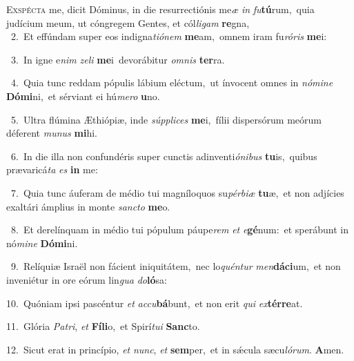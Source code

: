 \lettrine{\initial\textcolor{\initialcolor}{E}}{xspécta} me, dicit Dóminus, in die resurrectiónis me\textit{æ} \textit{in} \textit{fu}\-\textbf{tú}rum,~\star quia judícium meum, ut cóngregem Gentes, et cól\-\textit{li}\-\textit{gam} \textbf{re}\-gna,\\
{\numbfont\textcolor{\numbcolor}{~2.}}~Et effúndam super eos indigna\-\textit{ti}\-\textit{ó}\textit{nem} \textbf{me}\-am,~\star omnem iram fu\-\textit{ró}\-\textit{ris} \textbf{me}\-i:\par
{\numbfont\textcolor{\numbcolor}{~3.}}~In igne e\textit{nim} \textit{ze}\-\textit{li} \textbf{me}\-i~\star devorábitur \textit{om}\-\textit{nis} \textbf{ter}\-ra.\par
{\numbfont\textcolor{\numbcolor}{~4.}}~Quia tunc reddam pópulis lábium eléctum,~\dagger ut ínvocent omnes in \textit{nó}\-\textit{mi}\textit{ne} \textbf{Dó}\-\textbf{mi}ni,~\star et sérviant ei hú\-\textit{me}\-\textit{ro} \textbf{u}\-no.\par
{\numbfont\textcolor{\numbcolor}{~5.}}~Ultra flúmina Æthiópiæ, inde \textit{súp}\-\textit{pli}\textit{ces} \textbf{me}\-i,~\star fílii dispersórum meórum déferent \textit{mu}\-\textit{nus} \textbf{mi}\-hi.\par
{\numbfont\textcolor{\numbcolor}{~6.}}~In die illa non confundéris super cunctis adinventi\-\textit{ó}\-\textit{ni}\textit{bus} \textbf{tu}\-is,~\star quibus prævaricá\textit{ta} \textit{es} \textbf{in} me:\par
{\numbfont\textcolor{\numbcolor}{~7.}}~Quia tunc áuferam de médio tui magníloquos su\-\textit{pér}\-\textit{bi}\textit{æ} \textbf{tu}\-æ,~\star et non adjícies exaltári ámplius in monte \textit{sanc}\-\textit{to} \textbf{me}\-o.\par
{\numbfont\textcolor{\numbcolor}{~8.}}~Et derelínquam in médio tui pópulum páupe\textit{rem} \textit{et} \textit{e}\-\textbf{gé}num:~\star et sperábunt in nó\-\textit{mi}\-\textit{ne} \textbf{Dó}\-\textbf{mi}ni.\par
{\numbfont\textcolor{\numbcolor}{~9.}}~Relíquiæ Israël non fácient iniquitátem,~\dagger nec lo\-\textit{quén}\-\textit{tur} \textit{men}\-\textbf{dá}\textbf{ci}um,~\star et non inveniétur in ore eórum lin\textit{gua} \textit{do}\-\textbf{ló}sa:\par
{\numbfont\textcolor{\numbcolor}{10.}}~Quóniam ipsi pascéntur \textit{et} \textit{ac}\-\textit{cu}\textbf{bá}bunt,~\star et non erit \textit{qui} \textit{ex}\-\textbf{tér}\textbf{re}at.\par
{\numbfont\textcolor{\numbcolor}{11.}}~Glória \textit{Pa}\-\textit{tri}, \textit{et} \textbf{Fí}\-\textbf{li}o,~\star et Spirí\-\textit{tu}\-\textit{i} \textbf{Sanc}\-to.\par
{\numbfont\textcolor{\numbcolor}{12.}}~Sicut erat in princípio, \textit{et} \textit{nunc}\-, \textit{et} \textbf{sem}\-per,~\star et in sǽcula sæcu\-\textit{ló}\-\textit{rum}. \textbf{A}\-men.\par
